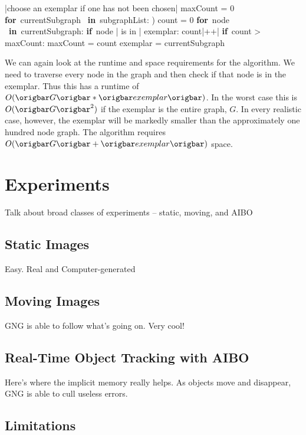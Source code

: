 \documentclass{article}
\renewcommand{\|}{\origbar} %
\renewcommand{\FOR}{\mbox{{\bf for} }\tab}
\renewcommand{\IF}{\mbox{{\bf if} }\tab}
\newcommand{\IN}{\mbox{ {\bf in} }}
\begin{document}
\begin{Algorithm}[h!]
\begin{program}
  |choose an exemplar if one has not been chosen|
  maxCount = 0
  \FOR currentSubgraph \IN subgraphList: )
    count = 0
    \FOR node \IN currentSubgraph:
      \IF node | is in | exemplar:
        count|++| \untab \untab
    \IF count > maxCount:
      maxCount = count
      exemplar = currentSubgraph
\end{program}
\caption{Pseudocode for Tracking Subgraphs}
\label{alg:trackingSubgraphs}
\end{Algorithm}

We can again look at the runtime and space requirements for the algorithm. We need to traverse every node in the graph and then check if that node is in the exemplar. Thus this has a runtime of $O(\|G\|*\|exemplar\|)$. In the worst case this is $O(\|G\|^2)$ if the exemplar is the entire graph, $G$. In every realistic case, however, the exemplar will be markedly smaller than the approximately one hundred node graph. The algorithm requires $O(\|G\|+\|exemplar\|)$ space.

\section{Experiments}

Talk about broad classes of experiments -- static, moving, and AIBO

\subsection{Static Images}

Easy. Real and Computer-generated

\subsection{Moving Images}

GNG is able to follow what's going on. Very cool!

\subsection{Real-Time Object Tracking with AIBO}

Here's where the implicit memory really helps. As objects move and disappear, GNG is able to cull useless errors.

\subsection{Limitations}
\end{document}
